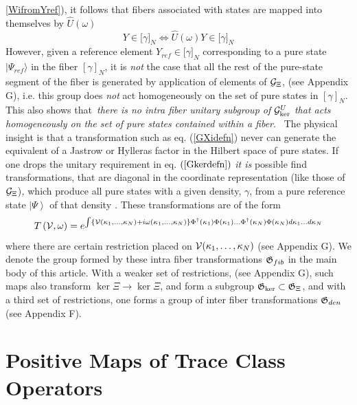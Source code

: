 \ref{WifromYref}), it follows that fibers associated with states are mapped
into themselves by $\hat{U}(\omega )$ 
\begin{equation}
Y\in \lbrack \gamma ]_{N}\Leftrightarrow \hat{U}(\omega )Y\in \lbrack \gamma
]_{N}
\end{equation}%
However, given a reference element $Y_{ref}\in \lbrack \gamma ]_{N}$
corresponding to a pure state $|\Psi _{ref}\rangle $ in the fiber $[\gamma
]_{N}$, it is {\em not} the case that all the rest of the pure-state segment
of the fiber is generated by application of elements of ${\cal G}_{\Xi }$,
(see Appendix G), i.e. this group does {\em not }act homogeneously on the
set of pure states in $[\gamma ]_{N}$. This also shows that{\em \ there is
no intra fiber unitary subgroup of }${\cal G}_{\ker }^{U}$ {\em that acts
homogeneously on the set of pure states contained within a fiber}.{\em \ }%
The physical insight is that a transformation such as eq. (\ref{GXidefn})
never can generate the equivalent of a Jastrow or Hylleras factor in the
Hilbert space of pure states. If one drops the unitary requirement in eq. $%
\left( \ref{Gkerdefn}\right) $ {\it it is} possible find transformations,
that are diagonal in the coordinate representation (like those of ${\cal G}%
_{\Xi }$){\it , }which produce all pure states with a given density, $\gamma 
$, from a pure reference state $\left| \Psi \right\rangle $ of that density%
{\it . }These transformations are of the form%
\begin{equation}
T\left( {\cal V},\omega \right) =e^{\int \left\{ {\cal V}(\kappa _{1},\ldots
,\kappa _{N})+i\omega (\kappa _{1},\ldots ,\kappa _{N})\right\} \Phi
^{\dagger }(\kappa _{1})\Phi (\kappa _{1})\ldots \Phi ^{\dagger }(\kappa
_{N})\Phi (\kappa _{N})d\kappa _{1}\ldots d\kappa _{N}}
\end{equation}%
where there are certain restriction placed on ${\cal V}(\kappa _{1},\ldots
,\kappa _{N})$ (see Appendix G). We denote the group formed by these intra
fiber transformations ${\frak G}_{fib}$ in the main body of this article.
With a weaker set of restrictions, (see Appendix G), such maps also
transform $\ker \Xi \rightarrow \ker \Xi $, and form a subgroup ${\frak G}%
_{\ker }\subset {\frak G}_{\Xi }$, and with a third set of restrictions, one
forms a group of inter fiber transformations ${\frak G}_{den}$ (see Appendix
F).

\section{Positive Maps of Trace Class Operators}

